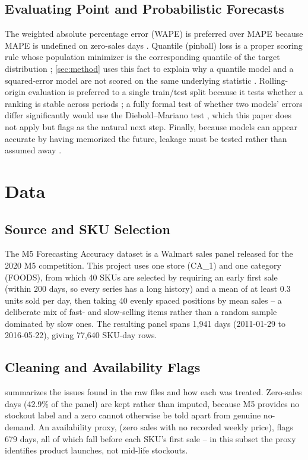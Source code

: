 \documentclass[conference]{IEEEtran}
\newcommand{\sig}[1]{\texttt{\detokenize{#1}}}
\begin{document}
\subsection{Evaluating Point and Probabilistic Forecasts}
The weighted absolute percentage error (WAPE) is preferred over MAPE because MAPE is undefined on
zero-sales days \cite{hyndman2006}. Quantile (pinball) loss is a proper scoring rule
\cite{gneiting2007} whose population minimizer is the corresponding quantile of the target
distribution \cite{koenker1978}; \cref{sec:method} uses this fact to explain why a quantile model
and a squared-error model are not scored on the same underlying statistic \cite{kolassa2020}.
Rolling-origin evaluation is preferred to a single train/test split because it tests whether a
ranking is stable across periods \cite{tashman2000}; a fully formal test of whether two models'
errors differ significantly would use the Diebold--Mariano test \cite{diebold1995}, which this
paper does not apply but flags as the natural next step. Finally, because models can appear accurate
by having memorized the future, leakage must be tested rather than assumed away
\cite{kaufman2012}.

\section{Data}
\label{sec:data}

\subsection{Source and SKU Selection}
The M5 Forecasting Accuracy dataset \cite{makridakis2022} is a Walmart sales panel released for the
2020 M5 competition. This project uses one store (CA\_1) and one category (FOODS), from which 40
SKUs are selected by requiring an early first sale (within 200 days, so every series has a long
history) and a mean of at least 0.3 units sold per day, then taking 40 evenly spaced positions by
mean sales -- a deliberate mix of fast- and slow-selling items rather than a random sample dominated
by slow ones. The resulting panel spans 1{,}941 days (2011-01-29 to 2016-05-22), giving 77{,}640
SKU-day rows.

\subsection{Cleaning and Availability Flags}
 summarizes the issues found in the raw files and how each was treated. Zero-sales
days (42.9\% of the panel) are kept rather than imputed, because M5 provides no stockout label and
a zero cannot otherwise be told apart from genuine no-demand. An availability proxy,
\sig{potential_unavailable} (zero sales with no recorded weekly price), flags 679 days, all of which
fall before each SKU's first sale -- in this subset the proxy identifies product launches, not
mid-life stockouts.
\end{document}
